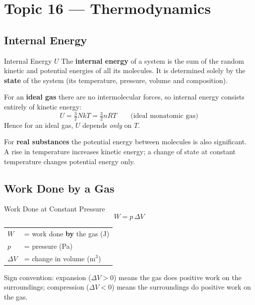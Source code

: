 \section{Topic 16 — Thermodynamics}

\subsection{Internal Energy}

\begin{defnbox}{Internal Energy $U$}
The \textbf{internal energy} of a system is the sum of the random kinetic and potential
energies of all its molecules. It is determined solely by the \textbf{state} of the
system (its temperature, pressure, volume and composition).
\end{defnbox}

For an \textbf{ideal gas} there are no intermolecular forces, so internal energy
consists entirely of kinetic energy:
\begin{equation}
  U = \tfrac{3}{2}NkT = \tfrac{3}{2}nRT \qquad \text{(ideal monatomic gas)}
\end{equation}
Hence for an ideal gas, $U$ depends \emph{only} on $T$.

For \textbf{real substances} the potential energy between molecules is also significant.
A rise in temperature increases kinetic energy; a change of state at constant
temperature changes potential energy only.

\subsection{Work Done by a Gas}

\begin{formulabox}{Work Done at Constant Pressure}
\begin{equation}
  W = p\,\Delta V
\end{equation}
\begin{tabular}{ll}
$W$        & = work done \textbf{by} the gas (J) \\
$p$        & = pressure (Pa) \\
$\Delta V$ & = change in volume (m$^3$) \\
\end{tabular}
\end{formulabox}

Sign convention: expansion ($\Delta V > 0$) means the gas does positive work on the
surroundings; compression ($\Delta V < 0$) means the surroundings do positive work on
the gas.

